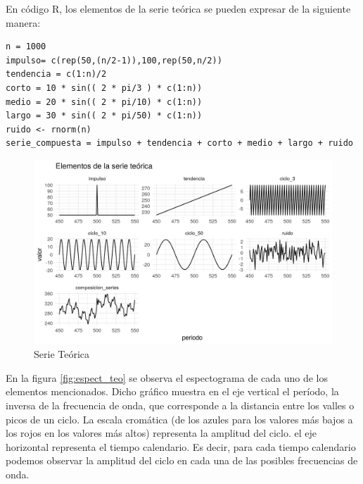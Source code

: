 \documentclass[a4paper]{article}
\begin{document}
En código R, los elementos de la serie teórica se pueden expresar de la siguiente manera:

\begin{lstlisting}
n = 1000
impulso= c(rep(50,(n/2-1)),100,rep(50,n/2))
tendencia = c(1:n)/2
corto = 10 * sin(( 2 * pi/3 ) * c(1:n))
medio = 20 * sin(( 2 * pi/10) * c(1:n))
largo = 30 * sin(( 2 * pi/50) * c(1:n))
ruido <- rnorm(n)
serie_compuesta = impulso + tendencia + corto + medio + largo + ruido
\end{lstlisting}


\begin{figure}[H]
	\centering
	\includegraphics[width=\linewidth]{serie_teorica.PNG}
	\caption{Serie Teórica} \label{fig:serie_teorica}
\end{figure}

En la figura \ref{fig:espect_teo} se observa el espectograma de cada uno de los elementos mencionados. Dicho gráfico muestra en el eje vertical el período, la inversa de la frecuencia de onda, que corresponde a la distancia entre los valles o picos de un ciclo. La escala cromática (de los azules para los valores más bajos a los rojos en los valores más altos) representa la amplitud del ciclo. el eje horizontal representa el tiempo calendario. Es decir, para cada tiempo calendario podemos observar la amplitud del ciclo en cada una de las posibles frecuencias de onda. 
\end{document}
